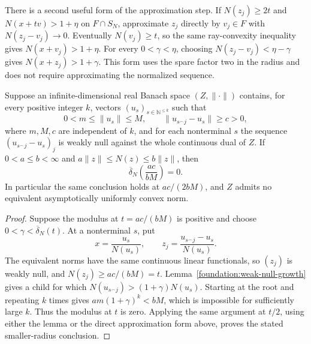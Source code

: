 There is a second useful form of the approximation step. If
$N(z_j)\ge2t$ and $N(x+tv)>1+\eta$ on $F\cap S_N$, approximate
$z_j$ directly by $v_j\in F$ with $N(z_j-v_j)\to0$.
Eventually $N(v_j)\ge t$, so the same ray-convexity inequality gives
$N(x+v_j)>1+\eta$. For every $0<\gamma<\eta$, choosing
$N(z_j-v_j)<\eta-\gamma$ gives $N(x+z_j)>1+\gamma$.
This form uses the spare factor two in the radius and does not require
approximating the normalized sequence.

\begin{proposition}\label{foundation:bounded-tree}
Suppose an infinite-dimensional real Banach space $(Z,\|\cdot\|)$
contains, for every positive
integer $k$, vectors $(u_s)_{s\in\mathbb N^{\le k}}$ such that
\[
 0<m\le\|u_s\|\le M,
 \qquad \|u_{s^\frown j}-u_s\|\ge c>0,
\]
where $m,M,c$ are independent of $k$, and for each nonterminal $s$ the
sequence $(u_{s^\frown j}-u_s)_j$ is weakly null against the whole
continuous dual of $Z$. If
$0<a\le b<\infty$ and $a\|z\|\le N(z)\le b\|z\|$, then
\[
 \overline\delta_N\!\left(\frac{ac}{bM}\right)=0.
\]
In particular the same conclusion holds at $ac/(2bM)$, and $Z$ admits
no equivalent asymptotically uniformly convex norm.
\end{proposition}
\begin{proof}
Suppose the modulus at $t=ac/(bM)$ is positive and choose
$0<\gamma<\overline\delta_N(t)$. At a nonterminal $s$, put
\[
 x=\frac{u_s}{N(u_s)},\qquad
 z_j=\frac{u_{s^\frown j}-u_s}{N(u_s)}.
\]
The equivalent norms have the same continuous linear functionals,
so $(z_j)$ is weakly null, and $N(z_j)\ge ac/(bM)=t$.
Lemma~\ref{foundation:weak-null-growth} gives a child for which
$N(u_{s^\frown j})>(1+\gamma)N(u_s)$. Starting at the root and
repeating $k$ times gives $am(1+\gamma)^k<bM$, which is impossible
for sufficiently large $k$. Thus the modulus at $t$ is zero. Applying
the same argument at $t/2$, using either the lemma or the direct
approximation form above, proves the stated smaller-radius conclusion.
\end{proof}


